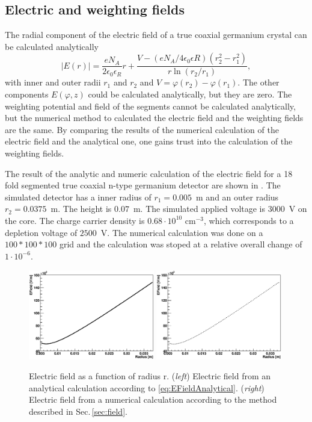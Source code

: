 \subsection{Electric and weighting fields}
\label{subsec:efield_wfield}
The radial component of the electric field of a true coaxial germanium crystal can be calculated analytically 
\begin{equation}
  \label{eq:EFieldAnalytical}
  |E(r)| = \frac{eN_{A}}{2\epsilon_{0}\epsilon_{R}} r + \frac{V - (eN_{A}/4\epsilon_{0}\epsilon{R})(r_{2}^{2}-r_{1}^{2})}{r \ln(r_{2}/r_{1})},
\end{equation}
with inner and outer radii $r_1$ and $r_2$ and $V = \varphi(r_2) - \varphi(r_1)$. The other components $E(\varphi,z)$ could be calculated analytically, but they are zero.
The weighting potential and field of the segments cannot be calculated analytically, but the numerical method to calculated the electric field and the weighting fields are the same. By comparing the results of the numerical calculation of the electric field and the analytical one, one gains trust into the calculation of the weighting fields.


The result of the analytic and numeric calculation of the electric field for a 18 fold segmented true coaxial n-type germanium detector are shown in . The simulated detector has a inner radius of $r_{1} = 0.005$~m and an outer radius $r_{2} = 0.0375$~m. The height is $0.07$~m. The simulated applied voltage is $3000$~V on the core. The charge carrier density is $0.68\cdot 10^{10} \text{~cm}^{-3}$, which corresponds to a depletion voltage of $2500$~V. The numerical calculation was done on a $100 \ast 100 \ast 100$ grid and the calculation was stoped at a relative overall change of $1 \cdot10^{-6}$. 
\begin{figure}
  \centering
  \includegraphics[width=0.49\textwidth]{EFieldAnalytical.eps}
  \includegraphics[width=0.49\textwidth]{EFieldNum.eps}
  \caption{Electric field as a function of radius r. (\emph{left}) Electric field from an analytical calculation according to \eqref{eq:EFieldAnalytical}. (\emph{right}) Electric field from a numerical calculation according to the method described in Sec.\,\ref{sec:field}. }
  \label{fig:efields}
\end{figure}

